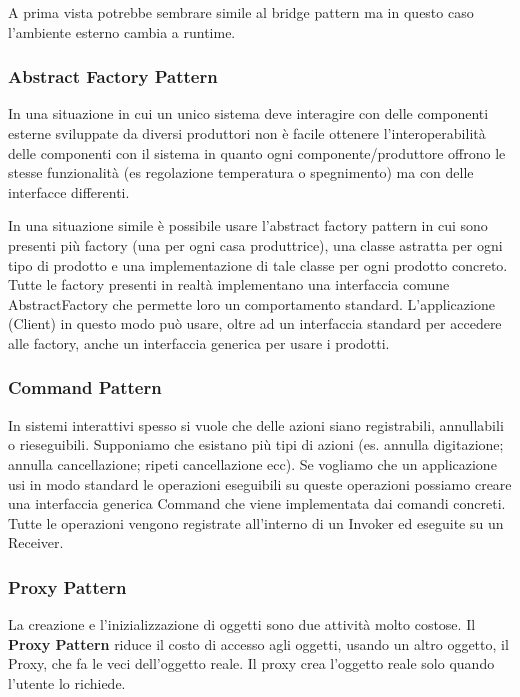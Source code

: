 \documentclass{article}
\begin{document}
            A prima vista potrebbe sembrare simile al bridge pattern ma in questo caso l’ambiente esterno cambia a runtime.
            
        \subsubsection{Abstract Factory Pattern}
        
            In una situazione in cui un unico sistema deve interagire con delle componenti esterne sviluppate da diversi produttori  non è facile ottenere l’interoperabilità delle componenti con il sistema in quanto ogni componente/produttore offrono le stesse funzionalità (es regolazione temperatura o spegnimento) ma con delle interfacce differenti. 
            
            In una situazione simile è possibile usare l’abstract factory pattern in cui sono presenti più factory (una per ogni casa produttrice), una classe astratta per ogni tipo di prodotto  e una implementazione di tale classe per ogni prodotto concreto. Tutte le factory presenti in realtà implementano una interfaccia comune AbstractFactory che permette loro un comportamento standard. L’applicazione (Client) in questo modo può usare, oltre ad un interfaccia standard per accedere alle factory, anche un interfaccia generica per usare i prodotti.
            
        \subsubsection{Command Pattern}
        
            In sistemi interattivi spesso si vuole che delle azioni siano registrabili, annullabili o rieseguibili. Supponiamo che esistano più tipi di azioni (es. annulla digitazione; annulla cancellazione; ripeti cancellazione ecc). Se vogliamo che un applicazione usi in modo standard le operazioni eseguibili su queste operazioni possiamo creare una interfaccia generica Command che viene implementata dai comandi concreti. Tutte le operazioni vengono registrate all’interno di un Invoker ed eseguite su un Receiver.
                
        \subsubsection{Proxy Pattern}
            
            La creazione e l'inizializzazione di oggetti sono due attività molto costose. Il \textbf{Proxy Pattern} riduce il costo di accesso agli oggetti, usando un altro oggetto, il Proxy, che fa le veci dell'oggetto reale. Il proxy crea l'oggetto reale solo quando l'utente lo richiede. 
                    
\end{document}
